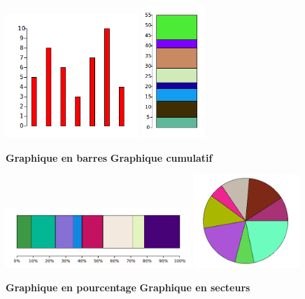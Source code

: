 \documentclass[11pt,class=report,crop=false]{standalone}
\begin{document}
\begin{activite}[Graphiques]


\begin{center}
\includegraphics[width=5cm]{ecran-stat-2a}\qquad\qquad
\includegraphics[height=5cm]{ecran-stat-2b}

\qquad\qquad\textbf{Graphique en barres}\qquad\qquad\quad
\textbf{Graphique cumulatif}
\end{center}

\begin{center}
\includegraphics[width=7cm]{ecran-stat-2c}\qquad\qquad
\includegraphics[width=4cm]{ecran-stat-2d}

\qquad\qquad\textbf{Graphique en pourcentage}\qquad\qquad\qquad
\textbf{Graphique en secteurs}
\end{center}


\end{activite}
\end{document}
